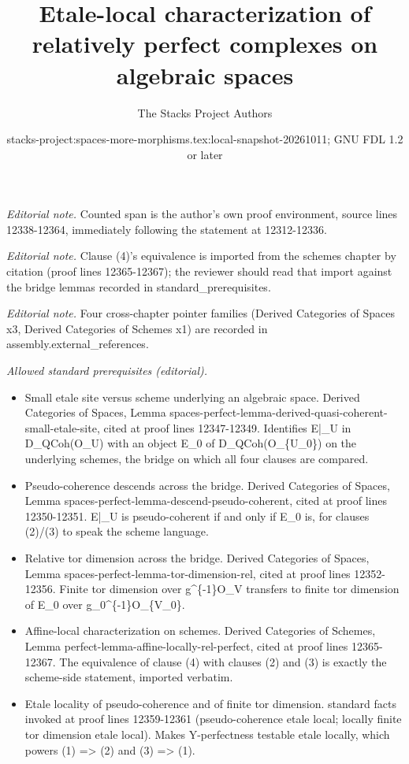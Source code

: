 \documentclass[10pt,a4paper]{amsart}
\title{Etale-local characterization of relatively perfect complexes on algebraic spaces}
\author{The Stacks Project Authors}
\date{stacks-project:spaces-more-morphisms.tex:local-snapshot-20261011; GNU FDL 1.2 or later}
\theoremstyle{plain}
\theoremstyle{definition}
\theoremstyle{remark}
\numberwithin{equation}{subsection}
\begin{document}
\maketitle
\noindent\textit{Editorial note.} Counted span is the author's own proof environment, source lines 12338-12364, immediately following the statement at 12312-12336.\par\medskip
\noindent\textit{Editorial note.} Clause (4)'s equivalence is imported from the schemes chapter by citation (proof lines 12365-12367); the reviewer should read that import against the bridge lemmas recorded in standard\_prerequisites.\par\medskip
\noindent\textit{Editorial note.} Four cross-chapter pointer families (Derived Categories of Spaces x3, Derived Categories of Schemes x1) are recorded in assembly.external\_references.\par\medskip
\noindent\textit{Allowed standard prerequisites (editorial).}\begin{itemize}
\item Small etale site versus scheme underlying an algebraic space. Derived Categories of Spaces, Lemma spaces-perfect-lemma-derived-quasi-coherent-small-etale-site, cited at proof lines 12347-12349. Identifies E|\_U in D\_QCoh(O\_U) with an object E\_0 of D\_QCoh(O\_\{U\_0\}) on the underlying schemes, the bridge on which all four clauses are compared.
\item Pseudo-coherence descends across the bridge. Derived Categories of Spaces, Lemma spaces-perfect-lemma-descend-pseudo-coherent, cited at proof lines 12350-12351. E|\_U is pseudo-coherent if and only if E\_0 is, for clauses (2)/(3) to speak the scheme language.
\item Relative tor dimension across the bridge. Derived Categories of Spaces, Lemma spaces-perfect-lemma-tor-dimension-rel, cited at proof lines 12352-12356. Finite tor dimension over g\textasciicircum{}\{-1\}O\_V transfers to finite tor dimension of E\_0 over g\_0\textasciicircum{}\{-1\}O\_\{V\_0\}.
\item Affine-local characterization on schemes. Derived Categories of Schemes, Lemma perfect-lemma-affine-locally-rel-perfect, cited at proof lines 12365-12367. The equivalence of clause (4) with clauses (2) and (3) is exactly the scheme-side statement, imported verbatim.
\item Etale locality of pseudo-coherence and of finite tor dimension. standard facts invoked at proof lines 12359-12361 (pseudo-coherence etale local; locally finite tor dimension etale local). Makes Y-perfectness testable etale locally, which powers (1) => (2) and (3) => (1).
\end{itemize}\medskip
\end{document}
